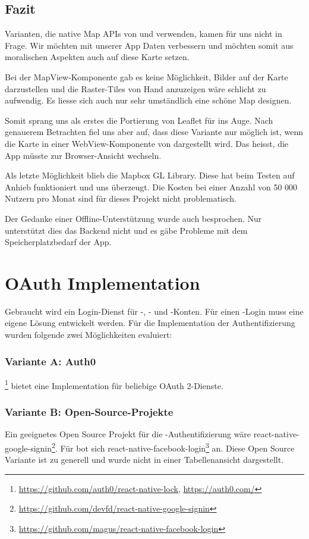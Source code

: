 \subsection{Fazit}
Varianten, die native Map APIs von  und  verwenden, kamen für uns nicht in Frage.
Wir möchten mit unserer App  Daten verbessern und möchten somit aus moralischen Aspekten auch auf diese Karte setzen. 

Bei der  MapView-Komponente gab es keine Möglichkeit, Bilder auf der Karte darzustellen und die Raster-Tiles von Hand anzuzeigen wäre schlicht zu aufwendig. 
Es liesse sich auch nur sehr umständlich eine schöne Map designen.

Somit sprang uns als erstes die Portierung von Leaflet für  ins Auge. 
Nach genauerem Betrachten fiel uns aber auf, dass diese Variante nur möglich ist, wenn die Karte in einer WebView-Komponente von  dargestellt wird. 
Das heisst, die App müsste zur Browser-Ansicht wechseln.

Als letzte Möglichkeit blieb die Mapbox GL Library.
Diese hat beim Testen auf Anhieb funktioniert und uns überzeugt.
Die Kosten bei einer Anzahl von 50 000 Nutzern pro Monat sind für dieses Projekt nicht problematisch.\cite{mapbox-pricing}

Der Gedanke einer Offline-Unterstützung wurde auch besprochen.
Nur unterstützt dies das Backend nicht und es gäbe Probleme mit dem Speicherplatzbedarf der App. 


\section{OAuth Implementation}
\label{tb-evaluation-oauth}
Gebraucht wird ein Login-Dienst für -, - und -Konten. 
Für einen -Login muss eine eigene Lösung entwickelt werden. 
Für die Implementation der Authentifizierung wurden folgende zwei Möglichkeiten evaluiert:


\subsubsection{Variante A: Auth0}
\footnote{\url{https://github.com/auth0/react-native-lock}, \url{https://auth0.com/}} bietet eine Implementation für beliebige \gls{OAuth} 2-Dienste. 


\subsubsection{Variante B: Open-Source-Projekte}
Ein geeignetes Open Source Projekt für die -Authentifizierung wäre react-native-google-signin\footnote{\url{https://github.com/devfd/react-native-google-signin}}. 
Für  bot sich react-native-facebook-login\footnote{\url{https://github.com/magus/react-native-facebook-login}} an. 
Diese Open Source Variante ist zu generell und wurde nicht in einer Tabellenansicht dargestellt. 

